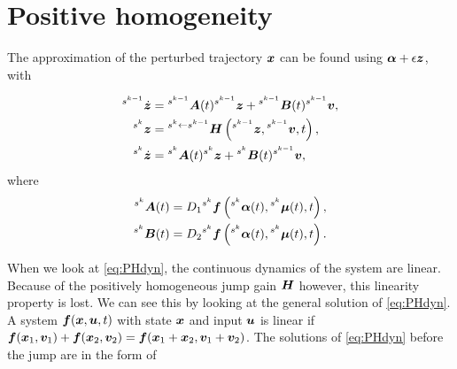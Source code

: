 \documentclass[../DC2017114Bouma.tex]{subfiles}
\begin{document}
\section{Positive homogeneity}\label{app:poshom}
The approximation of the perturbed trajectory $\xb$ can be found using $\alphab + \epsilon\zb$, with

\begin{align}
\ls^{s^{k-1}}\dot{\zb} &=\ls^{s^{k-1}}\Ab(t)\ls^{s^{k-1}}\zb +\ls^{s^{k-1}}\Bb(t)\ls^{s^{k-1}}\vb,\nonumber\\
\ls^{s^{k}}\zb &= \ls^{s^{k}\leftarrow s^{k-1}}\Hb\left(\ls^{s^{k-1}}\zb,\ls^{s^{k-1}}\vb,t\right),\label{eq:PHdyn}\\
\ls^{s^{k}}\dot{\zb} &=\ls^{s^{k}}\Ab(t)\ls^{s^{k}}\zb +\ls^{s^{k}}\Bb(t)\ls^{s^{k-1}}\vb,\nonumber
\end{align}
where
\begin{align}
^{s^{k}}\Ab(t) &= D_1\ls^{s^{k}}\fb\left(\ls^{s^{k}}\alphab(t),\ls^{s^{k}}\mub(t),t\right),\\
^{s^{k}}\Bb(t) &= D_2\ls^{s^{k}}\fb\left(\ls^{s^{k}}\alphab(t),\ls^{s^{k}}\mub(t),t\right).
\end{align}

When we look at \eqref{eq:PHdyn}, the continuous dynamics of the system are linear. Because of the positively homogeneous jump gain $\Hb$ however, this linearity property is lost. We can see this by looking at the general solution of \eqref{eq:PHdyn}. A system $\fb(\xb,\ub,t)$ with state $\xb$ and input $\ub$ is linear if $\fb(\xb_1,\vb_1) + \fb(\xb_2,\vb_2) = \fb(\xb_1+\xb_2,\vb_1+\vb_2)$. The solutions of \eqref{eq:PHdyn} before the jump are in the form of
\end{document}

